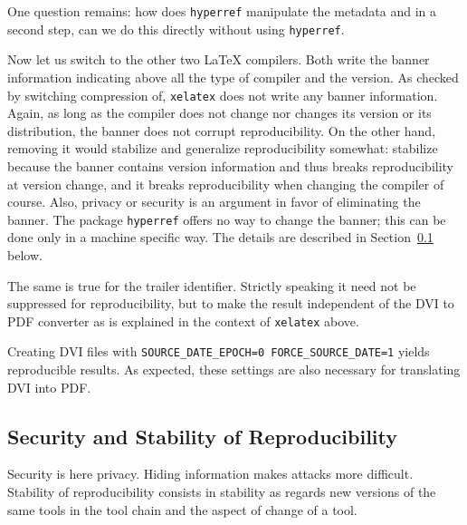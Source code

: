 \documentclass[a4paper]{article}%
\newcommand{\xelatex}{\texttt{xelatex}}
\begin{document}
One question remains: how does \texttt{hyperref} manipulate the metadata 
and in a second step, can we do this directly without using \texttt{hyperref}. 
\medskip


Now let us switch to the other two \LaTeX{} compilers. 
Both write the banner information indicating 
above all the type of compiler and the version. 
As checked by switching compression of, \xelatex{} does not write any banner information. 
Again, as long as the compiler does not change nor changes its version or its distribution, 
the banner does not corrupt reproducibility. 
On the other hand, removing it would stabilize and generalize reproducibility somewhat: 
stabilize because the banner contains version information 
and thus breaks reproducibility at version change, 
and it breaks reproducibility when changing the compiler of course. 
Also, privacy or security is an argument in favor of eliminating the banner. 
The package \texttt{hyperref} offers no way to change the banner; 
this can be done only in a machine specific way. 
The details are described in Section~\ref{subsec:securityRep} below. 

The same is true for the trailer identifier. 
Strictly speaking it need not be suppressed for reproducibility, 
but to make the result independent of the DVI to PDF converter 
as is explained in the context of \xelatex{} above. 

Creating DVI files with \texttt{SOURCE\_DATE\_EPOCH=0 FORCE\_SOURCE\_DATE=1} 
yields reproducible results. 
As expected, these settings are also necessary for translating DVI into PDF\@. 



\subsection{Security and Stability of Reproducibility}\label{subsec:securityRep}

Security is here privacy. 
Hiding information makes attacks more difficult. 
Stability of reproducibility consists in stability as regards new versions of the same tools 
in the tool chain and the aspect of change of a tool. 
\end{document}

